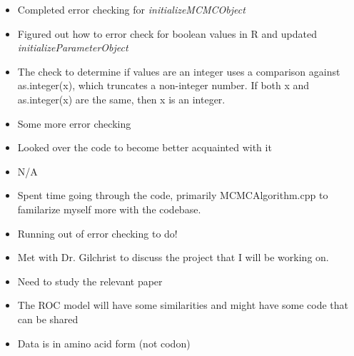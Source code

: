 \documentclass[12pt,hyperref]{labbook}
\begin{document}
\begin{itemize}
  \item Completed error checking for \textit{initializeMCMCObject}
  \item Figured out how to error check for boolean values in R and updated
\textit{initializeParameterObject} 
\end{itemize}
\begin{itemize}
  \item The check to determine if values are an integer uses a comparison
against as.integer(x), which truncates a non-integer number. If both x and 
as.integer(x) are the same, then x is an integer. 
\end{itemize}


\begin{itemize}
  \item Some more error checking
  \item Looked over the code to become better acquainted with it
\end{itemize}
\begin{itemize}
  \item N/A 
\end{itemize}

\begin{itemize}
  \item Spent time going through the code, primarily MCMCAlgorithm.cpp to
familarize myself more with the codebase.  
\end{itemize}
\begin{itemize}
  \item Running out of error checking to do!
\end{itemize}


\begin{itemize}
  \item Met with Dr. Gilchrist to discuss the project that I will be working on. 
\end{itemize}
\begin{itemize}
  \item Need to study the relevant paper
  \item The ROC model will have some similarities and might have some code that
can be shared
  \item Data is in amino acid form (not codon) 
\end{itemize}
\end{document}

